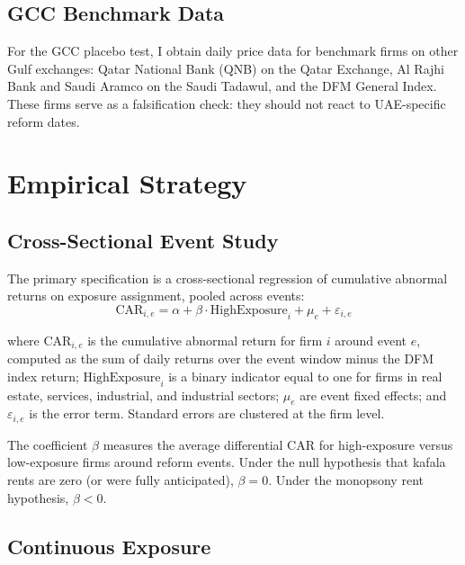 \documentclass[12pt]{article}
\begin{document}
\subsection{GCC Benchmark Data}

For the GCC placebo test, I obtain daily price data for benchmark firms on other Gulf exchanges: Qatar National Bank (QNB) on the Qatar Exchange, Al Rajhi Bank and Saudi Aramco on the Saudi Tadawul, and the DFM General Index. These firms serve as a falsification check: they should not react to UAE-specific reform dates.



\section{Empirical Strategy}\label{sec:empirical}

\subsection{Cross-Sectional Event Study}

The primary specification is a cross-sectional regression of cumulative abnormal returns on exposure assignment, pooled across events:
\begin{equation}\label{eq:main}
    \text{CAR}_{i,e} = \alpha + \beta \cdot \text{HighExposure}_i + \mu_e + \varepsilon_{i,e}
\end{equation}

\noindent where $\text{CAR}_{i,e}$ is the cumulative abnormal return for firm $i$ around event $e$, computed as the sum of daily returns over the event window minus the DFM index return; $\text{HighExposure}_i$ is a binary indicator equal to one for firms in real estate, services, industrial, and industrial sectors; $\mu_e$ are event fixed effects; and $\varepsilon_{i,e}$ is the error term. Standard errors are clustered at the firm level.

The coefficient $\beta$ measures the average differential CAR for high-exposure versus low-exposure firms around reform events. Under the null hypothesis that kafala rents are zero (or were fully anticipated), $\beta = 0$. Under the monopsony rent hypothesis, $\beta < 0$.

\subsection{Continuous Exposure}
\end{document}
